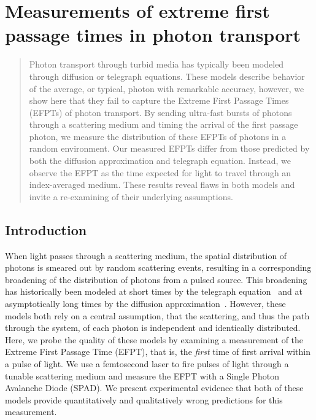 \chapter{Measurements of extreme first passage times in photon transport}


\begin{abstract}
    Photon transport through turbid media has typically been modeled through diffusion or telegraph equations. These models describe behavior of the average, or typical, photon with remarkable accuracy, however, we show here that they fail to capture the Extreme First Passage Times (EFPTs) of photon transport. By sending ultra-fast bursts of photons through a scattering medium and timing the arrival of the first passage photon, we measure the distribution of these EFPTs of photons in a random environment. Our measured EFPTs differ from those predicted by both the diffusion approximation and telegraph equation. Instead, we observe the EFPT as the time expected for light to travel through an index-averaged medium. These results reveal flaws in both models and invite a re-examining of their underlying assumptions.
\end{abstract}




\section{Introduction}

When light passes through a scattering medium, the spatial distribution of photons is smeared out by random scattering events, resulting in a corresponding broadening of the distribution of photons from a pulsed source. This broadening has historically been modeled at short times by the telegraph equation~\cite{goldstein_diffusion_1951,ishimaru_diffusion_1989,durian_photon_1997,lemieux_diffusing-light_1998} and at asymptotically long times by the diffusion approximation~\cite{haskell_boundary_1994,bohren_absorption_1983,ishimaru_wave_1997}.  However, these models both rely on a central assumption, that the scattering, and thus the path through the system, of each photon is independent and identically distributed.  Here, we probe the quality of these models by examining a measurement of the Extreme First Passage Time (EFPT), that is, the \textit{first} time of first arrival within a pulse of light.  We use a femtosecond laser to fire pulses of light through a tunable scattering medium and measure the EFPT with a Single Photon Avalanche Diode (SPAD).  We present experimental evidence that both of these models provide quantitatively and qualitatively wrong predictions for this measurement. 


